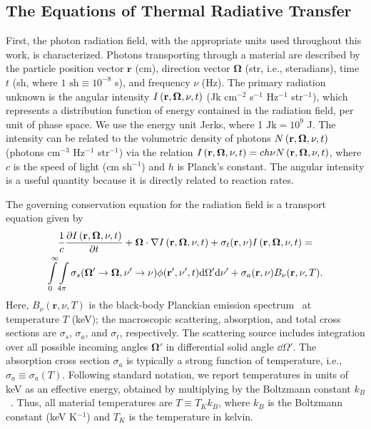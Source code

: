 \subsection{The Equations of Thermal Radiative Transfer}

First, the photon radiation field, with the appropriate units used throughout this work, is
characterized.  Photons transporting through a material are described by the particle position vector
$\mathbf{r}$ (cm), direction vector $\mathbf\Omega$ (str, i.e., steradians),
time $t$ (sh, where $1\text{ sh}\equiv10^{-8}$ s), and frequency $\nu$ (Hz).  The primary
radiation unknown is the angular intensity $I \left(\mathbf{r},\mathbf{\Omega},\nu,t\right)$ (Jk cm$^{-2}$ s$^{-1}$
Hz$^{-1}$ str$^{-1}$), which represents a distribution
function of energy
contained in the radiation field, per unit of
phase space.  We use the energy unit Jerks, where 1 $\text{Jk}= 10^9$ J. The intensity can be related to the volumetric density of photons
$N \left(\mathbf{r},\mathbf{\Omega},\nu,t\right)$ (photons cm$^{-3}$ Hz$^{-1}$ str$^{-1}$) via the relation  $I\left(\mathbf{r},\mathbf{\Omega},\nu,t\right) =
c h \nu N \left(\mathbf{r},\mathbf{\Omega},\nu,t\right)$, where $c$ is the speed of light (cm sh$^{-1}$) and $h$ is Planck's constant. The
angular intensity is a useful quantity because it is directly related to reaction rates.

The governing conservation equation for the radiation field is a transport equation given
by~\cite{mihalas,lewis,wollaber_thesis}
 \begin{multline}
     \frac{1}{c} \frac{\partial I\left(\mathbf{r},\mathbf{\Omega},\nu,t\right)}{\partial t} + \mathbf{\Omega}\cdot \nabla I \left(\mathbf{r},\mathbf{\Omega},\nu,t\right) + \sigma_t
     (\mathbf{r},\nu) I \left(\mathbf{r},\mathbf{\Omega},\nu,t\right) = \\ \int \limits_0^\infty \int \limits_{4\pi}
     \sigma_s(\mathbf{\Omega'} \rightarrow \mathbf{\Omega},\nu'\rightarrow\nu)
     \phi(\mathbf{r}',\nu',t) \mathrm{d} \Omega' \mathrm{d} \nu' +
     \sigma_a(\mathbf{r},\nu)B_\nu(\mathbf{r},\nu,T).
 \end{multline}
Here, $B_\nu(\mathbf{r},\nu,T)$ is the black-body Planckian emission
spectrum~\cite{mihalas} at temperature $T$ (keV); the macroscopic scattering, absorption, and total cross sections are $\sigma_s$,
$\sigma_a$, and $\sigma_t$, respectively. 
 The scattering source includes
integration over all possible incoming angles $\mathbf\Omega'$ in differential
solid angle $\dd \Omega'$.  The absorption cross section $\sigma_a$ is typically
a strong function of temperature, i.e., $\sigma_a\equiv \sigma_a(T)$.  Following standard notation, we
report temperatures in units of keV as an effective energy, obtained by multiplying by the Boltzmann
constant $k_B$~\cite{wollaber}.  Thus, all material temperatures are $T \equiv T_{K}
k_B$, where $k_B$ is the Boltzmann constant (keV K$^{-1}$) and $T_{K}$ is the temperature
in kelvin.

